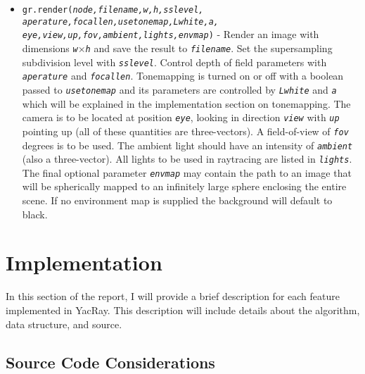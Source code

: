\documentclass[12pt]{article}
\begin{document}
\begin{itemize} \itemsep1pt \parskip0pt 

\item{\texttt{gr.render(\textit{node,filename,w,h,sslevel,\\aperature,focallen,usetonemap,Lwhite,a,\\eye,view,up,fov,ambient,lights,envmap})} - Render an image with dimensions \textit{\texttt{w$\times$h}} and save the result to \textit{\texttt{filename}}. Set the supersampling subdivision level with \textit{\texttt{sslevel}}. Control depth of field parameters with \textit{\texttt{aperature}} and \textit{\texttt{focallen}}. Tonemapping is turned on or off with a boolean passed to \textit{\texttt{usetonemap}} and its parameters are controlled by \textit{\texttt{Lwhite}} and \textit{\texttt{a}} which will be explained in the implementation section on tonemapping. The camera is to be located at position \textit{\texttt{eye}}, looking in direction \textit{\texttt{view}} with \textit{\texttt{up}} pointing up (all of these quantities are three-vectors). A field-of-view of \textit{\texttt{fov}} degrees is to be used. The ambient light should have an intensity of \textit{\texttt{ambient}} (also a three-vector). All lights to be used in raytracing are listed in \textit{\texttt{lights}}. The final optional parameter \textit{\texttt{envmap}} may contain the path to an image that will be spherically mapped to an infinitely large sphere enclosing the entire scene. If no environment map is supplied the background will default to black.}

	  
\end{itemize}

\section{Implementation}

In this section of the report, I will provide a brief description for each feature implemented in YacRay. This description will include details about the algorithm, data structure, and source.

\subsection{Source Code Considerations}
\end{document}
